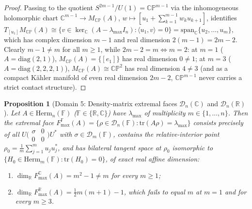 \documentclass[11pt,a4paper]{article}
\newcommand{\smmat}[1]{\bigl(\begin{smallmatrix}#1\end{smallmatrix}\bigr)}
\newtheorem{proposition}[theorem]{Proposition}
\theoremstyle{definition}
\theoremstyle{remark}
\newcommand{\RR}{\mathbb{R}}
\newcommand{\CC}{\mathbb{C}}
\newcommand{\FF}{\mathbb{F}}
\newcommand{\CP}{\mathbb{CP}}
\newcommand{\cD}{\mathcal{D}}
\newcommand{\Herm}{\mathrm{Herm}}
\newcommand{\tr}{\mathrm{tr}}
\newcommand{\diag}{\mathrm{diag}}
\begin{document}
\begin{proof}
Passing to the quotient $S^{2m-1} / U(1) = \CP^{m-1}$ via the inhomogeneous holomorphic chart $\CC^{m-1} \to M_{\CP}(A)$, $w \mapsto [u_1 + \sum_{k=1}^{m-1} w_k u_{k+1}]$, identifies $T_{[u_1]} M_{\CP}(A) \cong \{v \in \ker_{\CC}(A - \lambda_{\max} I_n) : \langle u_1, v \rangle = 0\} = \mathrm{span}_{\CC}\{u_2, \dots, u_m\}$, which has complex dimension $m - 1$ and real dimension $2(m - 1) = 2m - 2$. Clearly $m - 1 \neq m$ for all $m \ge 1$, while $2m - 2 = m \iff m = 2$: at $m = 1$ ($A = \diag(2, 1)$), $M_{\CP}(A) = \{[e_1]\}$ has real dimension $0 \neq 1$; at $m = 3$ ($A = \diag(2, 2, 2, 1)$), $M_{\CP}(A) \cong \CP^2$ has real dimension $4 \neq 3$ (and as a compact K\"ahler manifold of even real dimension $2m - 2$, $\CP^{m-1}$ never carries a strict contact structure).
\end{proof}

\begin{proposition}[Domain 5: Density-matrix extremal faces $\cD_n(\CC)$ and $\cD_n(\RR)$]
\label{prop:density_faces}
Let $A \in \Herm_n(\FF)$ ($\FF \in \{\RR, \CC\}$) have $\lambda_{\max}$ of multiplicity $m \in \{1, \dots, n\}$. Then the extremal face $F_{\max}^{\FF}(A) = \{\rho \in \cD_n(\FF) : \tr(A \rho) = \lambda_{\max}\}$ consists precisely of all $U \smmat{\sigma & 0 \\ 0 & 0} U^*$ with $\sigma \in \cD_m(\FF)$, contains the relative-interior point $\rho_0 = \frac{1}{m} \sum_{j=1}^m u_j u_j^*$, and has bilateral tangent space at $\rho_0$ isomorphic to $\{H_0 \in \Herm_m(\FF) : \tr(H_0) = 0\}$, of exact real affine dimension:
\begin{enumerate}
  \item[(a)] $\dim_{\RR} F_{\max}^{\CC}(A) = m^2 - 1 \neq m$ for \emph{every} $m \ge 1$;
  \item[(b)] $\dim_{\RR} F_{\max}^{\RR}(A) = \frac{1}{2}m(m+1) - 1$, which fails to equal $m$ at $m = 1$ and for \emph{every} $m \ge 3$.
\end{enumerate}
\end{proposition}
\end{document}

